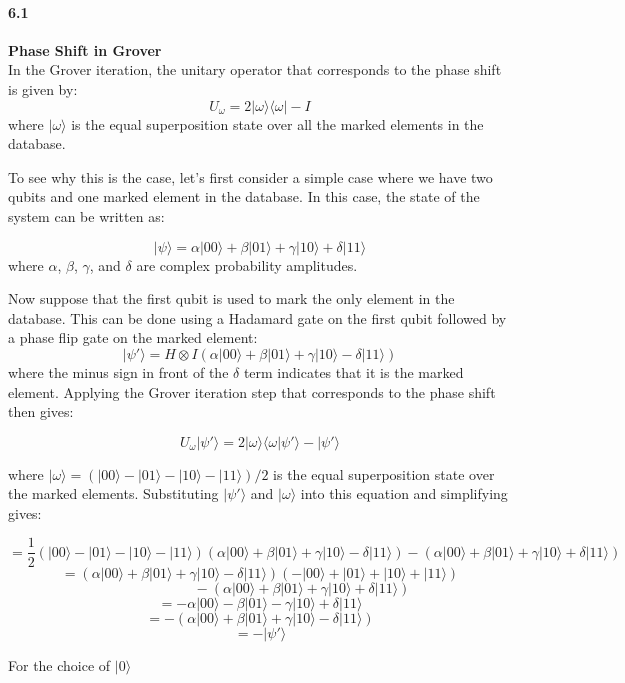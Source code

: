 \paragraph{6.1} \textbf{Phase Shift in Grover}
\\
In the Grover iteration, the unitary operator that corresponds to the phase shift is given by:
$$U_{\omega} = 2|\omega\rangle \langle \omega| - I$$
where $|\omega\rangle$ is the equal superposition state over all the marked elements in the database.

To see why this is the case, let's first consider a simple case where we have two qubits and one marked element in the database. In this case, the state of the system can be written as:

$$|\psi\rangle = \alpha |00\rangle + \beta|01\rangle + \gamma |10\rangle + \delta |11\rangle$$
where $\alpha$, $\beta$, $\gamma$, and $\delta$ are complex probability amplitudes.

Now suppose that the first qubit is used to mark the only element in the database. This can be done using a Hadamard gate on the first qubit followed by a phase flip gate on the marked element:
$$|\psi'\rangle = H \otimes I (\alpha |00\rangle + \beta|01\rangle + \gamma |10\rangle -\delta |11\rangle)$$
where the minus sign in front of the $\delta$ term indicates that it is the marked element. Applying the Grover iteration step that corresponds to the phase shift then gives:

$$U_{\omega}|\psi'\rangle = 2|\omega\rangle\langle \omega|\psi'\rangle - |\psi'\rangle$$

where $|\omega\rangle = (|00\rangle - |01\rangle - |10\rangle - |11\rangle)/2$ is the equal superposition state over the marked elements. Substituting $|\psi'\rangle$ and $|\omega\rangle$ into this equation and simplifying gives:


  $$  = \frac{1}{2}(|00\rangle - |01\rangle - |10\rangle - |11\rangle)(\alpha|00\rangle + \beta|01\rangle + \gamma|10\rangle - \delta|11\rangle) - (\alpha|00\rangle + \beta|01\rangle + \gamma|10\rangle + \delta|11\rangle) $$
$$= (\alpha|00\rangle + \beta|01\rangle + \gamma|10\rangle - \delta|11\rangle)(-|00\rangle + |01\rangle + |10\rangle + |11\rangle) $$
$$\qquad\qquad\qquad - (\alpha|00\rangle + \beta|01\rangle + \gamma|10\rangle + \delta|11\rangle) $$
$$= -\alpha|00\rangle - \beta|01\rangle - \gamma|10\rangle + \delta|11\rangle $$
$$= -(\alpha|00\rangle + \beta|01\rangle + \gamma|10\rangle - \delta|11\rangle) $$
$$= -|\psi'\rangle $$

For the choice of $|0\rangle$

